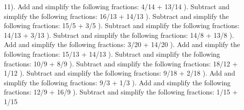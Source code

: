 \documentclass{article}%
\begin{document}
11). Add and simplify the following fractions: 4/14 + 13/14%
\newline%
\newline%
). Subtract and simplify the following fractions: 16/13 + 14/13%
\newline%
\newline%
). Subtract and simplify the following fractions: 15/5 + 3/5%
\newline%
\newline%
). Subtract and simplify the following fractions: 14/13 + 3/13%
\newline%
\newline%
). Subtract and simplify the following fractions: 14/8 + 13/8%
\newline%
\newline%
). Add and simplify the following fractions: 3/20 + 14/20%
\newline%
\newline%
). Add and simplify the following fractions: 15/13 + 14/13%
\newline%
\newline%
). Subtract and simplify the following fractions: 10/9 + 8/9%
\newline%
\newline%
). Subtract and simplify the following fractions: 18/12 + 1/12%
\newline%
\newline%
). Subtract and simplify the following fractions: 9/18 + 2/18%
\newline%
\newline%
). Add and simplify the following fractions: 9/3 + 1/3%
\newline%
\newline%
). Add and simplify the following fractions: 12/9 + 16/9%
\newline%
\newline%
). Subtract and simplify the following fractions: 1/15 + 1/15%
\end{document}
